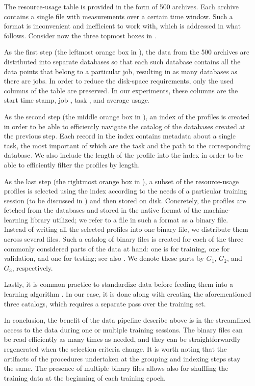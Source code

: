The resource-usage table is provided in the form of 500 archives. Each archive
contains a single file with measurements over a certain time window. Such a
format is inconvenient and inefficient to work with, which is addressed in what
follows. Consider now the three topmost boxes in .

As the first step (the leftmost orange box in ), the data
from the 500 archives are distributed into separate databases so that each such
database contains all the data points that belong to a particular job, resulting
in as many databases as there are jobs. In order to reduce the disk-space
requirements, only the used columns of the table are preserved. In our
experiments, these columns are the start time stamp, job , task ,
and average  usage.

As the second step (the middle orange box in ), an index
of the profiles is created in order to be able to efficiently navigate the
catalog of the databases created at the previous step. Each record in the index
contains metadata about a single task, the most important of which are the task
 and the path to the corresponding database. We also include the length
of the profile into the index in order to be able to efficiently filter the
profiles by length.

As the last step (the rightmost orange box in ), a subset
of the resource-usage profiles is selected using the index according to the
needs of a particular training session (to be discussed in
) and then stored on disk. Concretely, the profiles are
fetched from the databases and stored in the native format of the
machine-learning library utilized; we refer to a file in such a format as a
binary file. Instead of writing all the selected profiles into one binary file,
we distribute them across several files. Such a catalog of binary files is
created for each of the three commonly considered parts \cite{hastie2013} of the
data at hand: one is for training, one for validation, and one for testing; see
also . We denote these parts by $G_1$, $G_2$, and $G_3$,
respectively.

Lastly, it is common practice to standardize data before feeding them into a
learning algorithm \cite{hastie2013}. In our case, it is done along with
creating the aforementioned three catalogs, which requires a separate pass over
the training set.

In conclusion, the benefit of the data pipeline describe above is in the
streamlined access to the data during one or multiple training sessions. The
binary files can be read efficiently as many times as needed, and they can be
straightforwardly regenerated when the selection criteria change. It is worth
noting that the artifacts of the procedures undertaken at the grouping and
indexing steps stay the same. The presence of multiple binary files allows also
for shuffling the training data at the beginning of each training epoch.

